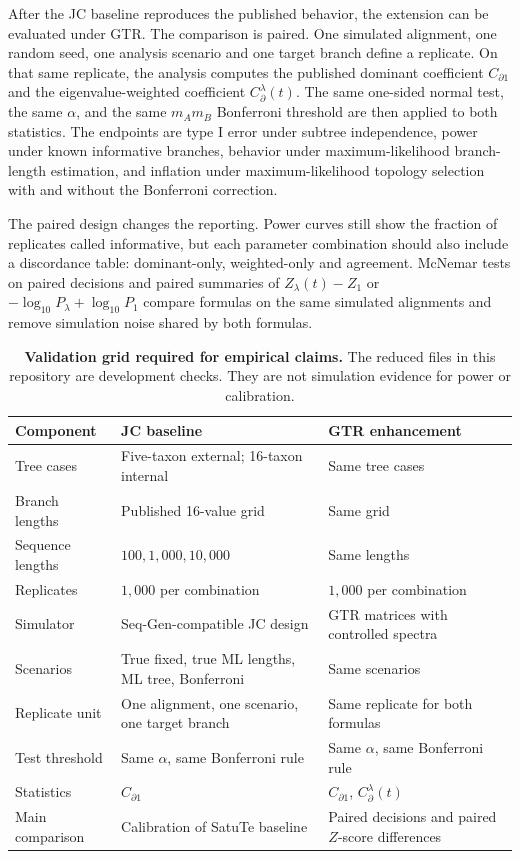 \documentclass[11pt]{article}
\begin{document}
After the JC baseline reproduces the published behavior, the extension can be evaluated under GTR. The comparison is paired. One simulated alignment, one random seed, one analysis scenario and one target branch define a replicate. On that same replicate, the analysis computes the published dominant coefficient \(C_{\partial 1}\) and the eigenvalue-weighted coefficient \(C_{\partial}^{\lambda}(t)\). The same one-sided normal test, the same \(\alpha\), and the same \(m_A m_B\) Bonferroni threshold are then applied to both statistics. The endpoints are type I error under subtree independence, power under known informative branches, behavior under maximum-likelihood branch-length estimation, and inflation under maximum-likelihood topology selection with and without the Bonferroni correction.

The paired design changes the reporting. Power curves still show the fraction of replicates called informative, but each parameter combination should also include a discordance table: dominant-only, weighted-only and agreement. McNemar tests on paired decisions and paired summaries of \(Z_{\lambda}(t)-Z_1\) or \(-\log_{10}P_{\lambda}+\log_{10}P_1\) compare formulas on the same simulated alignments and remove simulation noise shared by both formulas.

\begin{table}[htbp]
  \centering
  \caption{\textbf{Validation grid required for empirical claims.} The reduced files in this repository are development checks. They are not simulation evidence for power or calibration.}
  \small
  \begin{tabular}{p{}p{}p{}}
    \toprule
    Component & JC baseline & GTR enhancement \\
    \midrule
    Tree cases & Five-taxon external; 16-taxon internal & Same tree cases \\
    Branch lengths & Published 16-value grid & Same grid \\
    Sequence lengths & \(100,1{,}000,10{,}000\) & Same lengths \\
    Replicates & \(1{,}000\) per combination & \(1{,}000\) per combination \\
    Simulator & Seq-Gen-compatible JC design & GTR matrices with controlled spectra \\
    Scenarios & True fixed, true ML lengths, ML tree, Bonferroni & Same scenarios \\
    Replicate unit & One alignment, one scenario, one target branch & Same replicate for both formulas \\
    Test threshold & Same \(\alpha\), same Bonferroni rule & Same \(\alpha\), same Bonferroni rule \\
    Statistics & \(C_{\partial 1}\) & \(C_{\partial 1}\), \(C_{\partial}^{\lambda}(t)\) \\
    Main comparison & Calibration of SatuTe baseline & Paired decisions and paired \(Z\)-score differences \\
    \bottomrule
  \end{tabular}
\end{table}
\end{document}
